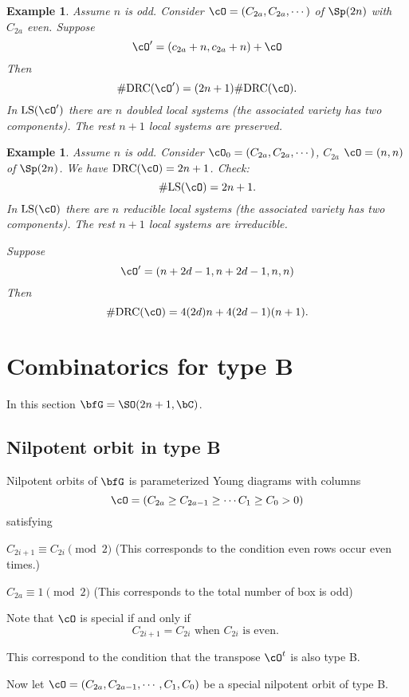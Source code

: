\documentclass[12pt,a4paper]{amsart}
\numberwithin{equation}{section}
\newtheorem{eg}[thm]{Example}
\theoremstyle{remark}
\def\drc{\mathrm{DRC}}
\def\LS{\mathrm{LS}}
\begin{document}
\begin{eg}
  Assume $n$ is odd. Consider $\cO = (C_{2a},C_{2a}, \cdots )$ of $\Sp(2n)$
  with $C_{2a}$ even. 
  Suppose
  \[
    \cO' = (c_{2a}+n,c_{2a}+n)+\cO
  \]
  Then
  \[
    \#\drc(\cO') = (2n+1) \#\drc(\cO).
  \]
  In $\LS(\cO')$ there are $n$ doubled local systems (the associated variety has
  two components). The rest $n+1$ local systems are preserved.  
\end{eg}

\begin{eg}
  Assume $n$ is odd. Consider $\cO_0 = (C_{2a},C_{2a}, \cdots )$,
  $C_{2a}$ 
  $\cO = (n,n)$ of $\Sp(2n)$.
  We have $\drc(\cO) = 2n+1$.
  {\color{red} Check: \[ \# \LS(\cO) = 2n+1.\]}
  In $\LS(\cO)$ there are $n$ reducible local systems (the associated variety has
  two components). The rest $n+1$ local systems are irreducible.  

  Suppose
  \[
    \cO' = (n+2d-1, n+2d-1, n,n)
  \]
  Then
  \[
    \#\drc(\cO) = 4(2d)n + 4(2d-1)(n+1).
  \]
\end{eg}

\section{Combinatorics for type B }
In this section $\bfG = \SO(2n+1,\bC)$.

\subsection{Nilpotent orbit in type B}
Nilpotent orbits of $\bfG$ is parameterized Young diagrams with columns
\[
  \cO = (C_{2a}\geq C_{2a-1} \geq\cdots C_{1} \geq C_0 > 0)
\]
satisfying
\begin{enumC}
\item $C_{2i+1} \equiv C_{2i } \pmod{2}$ (This corresponds to the condition even rows occur
  even times.) 
\item $C_{2a} \equiv 1 \pmod{2}$ (This corresponds to the total number of box is odd)  
\end{enumC}

Note that  $\cO$ is  special if and only if 
\[
  C_{2i+1} = C_{2i} \text{ when $C_{2i}$ is even. }
\]



This correspond to the condition that the transpose $\cO^t$ is also type B.

Now let $\cO = (C_{2a}, C_{2a-1}, \cdots, C_1, C_0)$ be a special nilpotent
orbit of type B.
\end{document}
